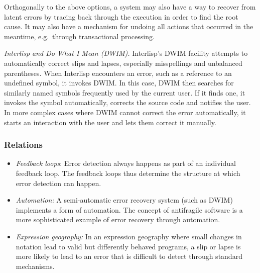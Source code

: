 \documentclass[english,submission]{programming}
\providecommand{\DIFaddbegin}{} %
\providecommand{\DIFaddend}{} %
\providecommand{\DIFdelbegin}{} %
\providecommand{\DIFdelend}{} %
\begin{document}
Orthogonally to the above options, a system may also have a way to
recover from latent errors by tracing back through the execution in
order to find the root cause. It may also have a mechanism for undoing
all actions that occurred in the meantime, e.g.~through transactional
processing.

\emph{Interlisp and Do What I Mean (DWIM).} Interlisp's DWIM facility
attempts to automatically correct slips and lapses, especially
misspellings and unbalanced parentheses. When Interlisp encounters an
error, such as a reference to an undefined symbol, it invokes DWIM. In
this case, DWIM then searches for similarly named symbols frequently
used by the current user. If it finds one, it invokes the symbol
automatically, corrects the source code and notifies the user. In more
complex cases where DWIM cannot correct the error automatically, it
starts an interaction with the user and lets them correct it manually.

\DIFdelbegin %
\DIFdelend \DIFaddbegin \hypertarget{relations-4}{%
\subsubsection{Relations}\label{relations-4}}
\DIFaddend 

\begin{itemize}
\tightlist
\item
  \emph{Feedback loops}: Error detection always happens as part of an
  individual feedback loop. The feedback loops thus determine the
  structure at which error detection can happen.
\item
  \emph{Automation:} A semi-automatic error recovery system (such as
  DWIM) implements a form of automation. The concept of antifragile
  software \cite{Antifragile} is a more sophisticated example of error
  recovery through automation.
\item
  \emph{Expression geography:} In an expression geography where small
  changes in notation lead to valid but differently behaved programs, a
  slip or lapse is more likely to lead to an error that is difficult to
  detect through standard mechanisms.
\end{itemize}
\end{document}
